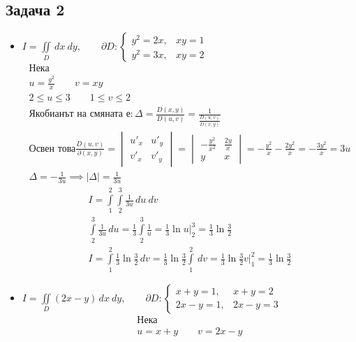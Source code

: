 \documentclass[a4paper,fleqn,12pt]{article}
\theoremstyle{definition}
\begin{document}
\subsection*{Задача 2}
\begin{itemize}
\item $I = \iint\limits_D \, dx \ dy, \qquad 
\partial D: \begin{cases} y^2 = 2x, & xy=1 \\ y^2 = 3x, & xy=2 \end{cases}$
\begin{gather*}
\text{Нека} \\
u = \frac{y^2}{x} \qquad v = xy \\
2 \leq u \leq 3 \qquad 1 \leq v \leq 2 \\
\text{Якобианът на смяната е}:
\Delta = \frac{D(x,y)}{D(u,v)} = \frac{1}{\frac{D(u,v)}{D(x,y)}}\\
\text{Освен това}
\frac{D(u,v)}{\partial (x,y)} = \begin{vmatrix} u'_x & u'_y \\ v'_x & v'_y \end{vmatrix} =  \begin{vmatrix} - \frac{y^2}{x^2} &\frac{2y}{x}\\ y & x \end{vmatrix} = - \frac{y^2}{x} - \frac{2y^2}{x} =  - \frac{3y^2}{x} = 3u \\
\Delta = - \frac{1}{3u} \implies |\Delta| = \frac{1}{3u} 
\end{gather*}
\begin{gather*}
I = \int\limits_1 ^2 \int\limits_2 ^3 \frac{1}{3u} \, du \ dv \\
\int\limits_2 ^3 \frac{1}{3u} \, du  = 
\frac{1}{3} \int\limits_2 ^3 \frac{1}{u} = 
\frac{1}{3} \ln u \Big|_2 ^3  = \frac{1}{3} \ln \frac{3}{2} \\
I = \int\limits_1 ^2 \frac{1}{3} \ln \frac{3}{2} \, dv = 
\frac{1}{3} \ln \frac{3}{2} \int\limits_1 ^2 \, dv  = 
\frac{1}{3} \ln \frac{3}{2} v\Big|_1 ^2 = 
\frac{1}{3} \ln \frac{3}{2}
\end{gather*}
\item $I = \iint\limits_D (2x - y)\, dx \ dy, \qquad 
\partial D: \begin{cases} x+y = 1, & x+y=2 \\ 2x-y = 1, & 2x-y = 3 \end{cases}$
\begin{gather*}
\text{Нека} \\
u = x+y \qquad v = 2x-y \\

\end{gather*}
\end{itemize}
\end{document}

